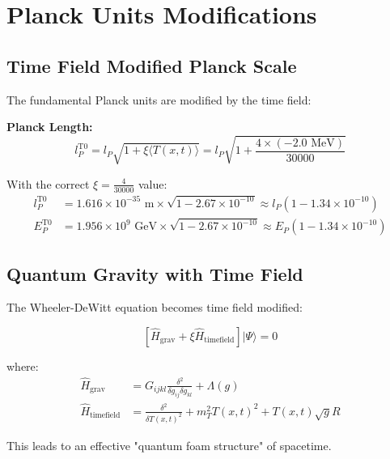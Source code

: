 \documentclass[12pt,a4paper]{report}
\newcommand{\Tfield}{T(x,t)}  %
\newcommand{\xipar}{\xi}      %
\begin{document}
	\section{Planck Units Modifications}\label{sec:planck_units_modifications}
	
	\subsection{Time Field Modified Planck Scale}\label{subsec:timefield_planck_scale}
	
	The fundamental Planck units are modified by the time field:
	
	\textbf{Planck Length:}
	\begin{equation}\label{eq:planck_length_t0}
		l_P^{\text{T0}} = l_P \sqrt{1 + \xipar \langle \Tfield \rangle} = l_P \sqrt{1 + \frac{4 \times (-2.0 \text{ MeV})}{30000}}
	\end{equation}
	
	With the correct $\xipar = \frac{4}{30000}$ value:
	\begin{align}
		l_P^{\text{T0}} &= 1.616 \times 10^{-35} \text{ m} \times \sqrt{1 - 2.67 \times 10^{-10}} \approx l_P \left(1 - 1.34 \times 10^{-10}\right) \\
		E_P^{\text{T0}} &= 1.956 \times 10^9 \text{ GeV} \times \sqrt{1 - 2.67 \times 10^{-10}} \approx E_P \left(1 - 1.34 \times 10^{-10}\right)
	\end{align}
	
	\subsection{Quantum Gravity with Time Field}\label{subsec:quantum_gravity_timefield}
	
	The Wheeler-DeWitt equation becomes time field modified:
	
	\begin{equation}\label{eq:wheeler_dewitt_t0}
		\left[\hat{H}_{\text{grav}} + \xipar \hat{H}_{\text{timefield}}\right] |\Psi\rangle = 0
	\end{equation}
	
	where:
	\begin{align}
		\hat{H}_{\text{grav}} &= G_{ijkl} \frac{\delta^2}{\delta g_{ij} \delta g_{kl}} + \Lambda(g) \\
		\hat{H}_{\text{timefield}} &= \frac{\delta^2}{\delta \Tfield^2} + m_T^2 \Tfield^2 + \Tfield \sqrt{g} R
	\end{align}
	
	This leads to an effective "quantum foam structure" of spacetime.
	
\end{document}
